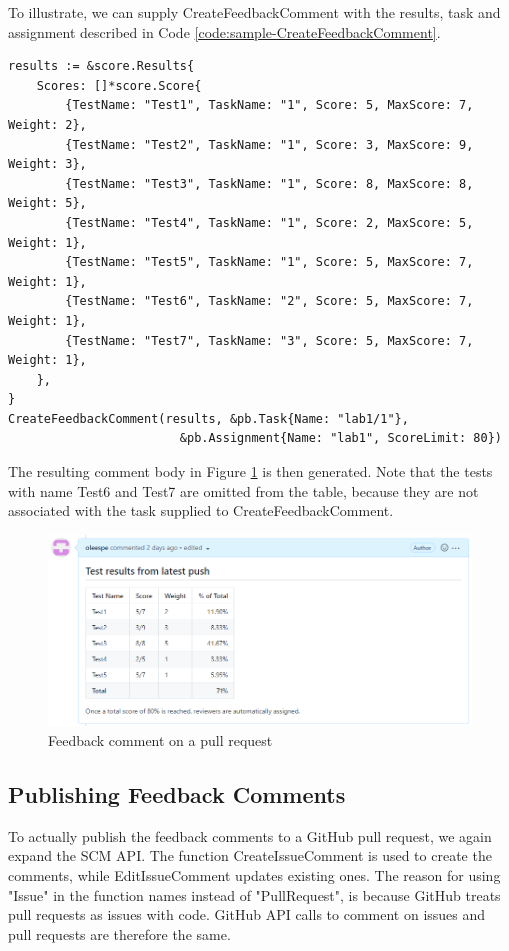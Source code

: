 To illustrate, we can supply CreateFeedbackComment with the results, task and assignment described in Code \ref{code:sample-CreateFeedbackComment}.
\pagebreak
\begin{lstlisting}[caption={Example of a CreateFeedbackComment run}, label={code:sample-CreateFeedbackComment}, language=Golang]
results := &score.Results{
	Scores: []*score.Score{
		{TestName: "Test1", TaskName: "1", Score: 5, MaxScore: 7, Weight: 2},
		{TestName: "Test2", TaskName: "1", Score: 3, MaxScore: 9, Weight: 3},
		{TestName: "Test3", TaskName: "1", Score: 8, MaxScore: 8, Weight: 5},
		{TestName: "Test4", TaskName: "1", Score: 2, MaxScore: 5, Weight: 1},
		{TestName: "Test5", TaskName: "1", Score: 5, MaxScore: 7, Weight: 1},
		{TestName: "Test6", TaskName: "2", Score: 5, MaxScore: 7, Weight: 1},
		{TestName: "Test7", TaskName: "3", Score: 5, MaxScore: 7, Weight: 1},
	},
}
CreateFeedbackComment(results, &pb.Task{Name: "lab1/1"}, 
                        &pb.Assignment{Name: "lab1", ScoreLimit: 80})
\end{lstlisting}

The resulting comment body in Figure \ref{fig:feedback-comment} is then generated.
Note that the tests with name Test6 and Test7 are omitted from the table, because they are not associated with the task supplied to CreateFeedbackComment.

\begin{figure}[ht]
    \centering
    \includegraphics[width=\textwidth]{photos/feedback-comment.PNG}
    \caption{Feedback comment on a pull request}
    \label{fig:feedback-comment}
\end{figure}

\subsection{Publishing Feedback Comments}

To actually publish the feedback comments to a GitHub pull request, we again expand the SCM API.
The function CreateIssueComment is used to create the comments, while EditIssueComment updates existing ones.
The reason for using "Issue" in the function names instead of "PullRequest", is because GitHub treats pull requests as issues with code.
GitHub API calls to comment on issues and pull requests are therefore the same.

